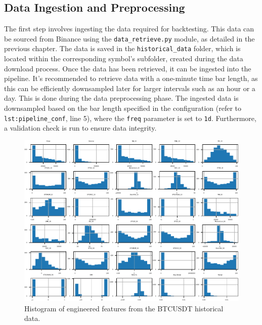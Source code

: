 \subsection{Data Ingestion and Preprocessing}
The first step involves ingesting the data required for backtesting. This data can be sourced from Binance using the \texttt{data_retrieve.py} module, as detailed in the previous chapter.
The data is saved in the \texttt{historical_data} folder, which is located within the corresponding symbol's subfolder, created during the data download process.
Once the data has been retrieved, it can be ingested into the pipeline. It's recommended to retrieve data with a one-minute time bar length,
as this can be efficiently downsampled later for larger intervals such as an hour or a day.
This is done during the data preprocessing phase. The ingested data is downsampled based on the bar length specified in the configuration (refer to \lstinline[label=lst:pipeline_conf]{lst:pipeline_conf}, line 5), where the \texttt{freq} parameter is set to \texttt{1d}.
Furthermore, a validation check is run to ensure data integrity.

\begin{figure}[h]
\centering
\begin{adjustbox}{max width=1\textwidth,center}
    \includegraphics[scale=1]{./pdf/dataset_histogram.pdf}
\end{adjustbox}
\caption{Histogram of engineered features from the BTCUSDT historical data.}
\label{fig:dataset_histogram}
\end{figure}


\FloatBarrier %
